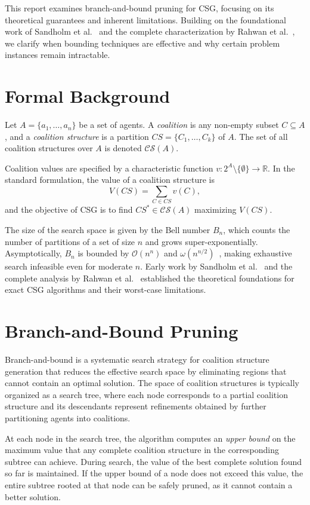 \documentclass{article}
\begin{document}
This report examines branch-and-bound pruning for CSG, focusing on its theoretical guarantees and inherent limitations. Building on the foundational work of Sandholm et al.~\cite{sandholm1999coalition} and the complete characterization by Rahwan et al.~\cite{rahwan2011minimum}, we clarify when bounding techniques are effective and why certain problem instances remain intractable.

\section{Formal Background}

Let $A = \{a_1, \dots, a_n\}$ be a set of agents. A \emph{coalition} is any non-empty subset $C \subseteq A$, and a \emph{coalition structure} is a partition $CS = \{C_1, \dots, C_k\}$ of $A$. The set of all coalition structures over $A$ is denoted $\mathcal{CS}(A)$.

Coalition values are specified by a characteristic function $v : 2^A \setminus \{\emptyset\} \rightarrow \mathbb{R}$. In the standard formulation, the value of a coalition structure is
\[
  V(CS) = \sum_{C \in CS} v(C),
\]
and the objective of CSG is to find $CS^* \in \mathcal{CS}(A)$ maximizing $V(CS)$.

The size of the search space is given by the Bell number $B_n$, which counts the number of partitions of a set of size $n$ and grows super-exponentially. Asymptotically, $B_n$ is bounded by $\mathcal{O}(n^n)$ and $\omega(n^{n/2})$~\cite{sandholm1999coalition}, making exhaustive search infeasible even for moderate $n$. Early work by Sandholm et al.~\cite{sandholm1999coalition} and the complete analysis by Rahwan et al.~\cite{rahwan2011minimum} established the theoretical foundations for exact CSG algorithms and their worst-case limitations.

\section{Branch-and-Bound Pruning}

Branch-and-bound is a systematic search strategy for coalition structure generation that reduces the effective search space by eliminating regions that cannot contain an optimal solution. The space of coalition structures is typically organized as a search tree, where each node corresponds to a partial coalition structure and its descendants represent refinements obtained by further partitioning agents into coalitions.

At each node in the search tree, the algorithm computes an \emph{upper bound} on the maximum value that any complete coalition structure in the corresponding subtree can achieve. During search, the value of the best complete solution found so far is maintained. If the upper bound of a node does not exceed this value, the entire subtree rooted at that node can be safely pruned, as it cannot contain a better solution.
\end{document}
